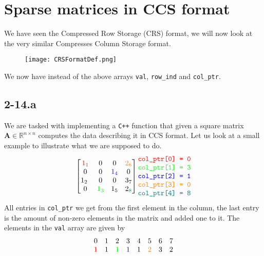 \documentclass{article}
\begin{document}
\section*{Sparse matrices in CCS format}
We have seen the Compressed Row Storage (CRS) format, we will now look at the very similar Compresses Column Storage format.

\begin{figure}[!hbt]
    \centering
\texttt{[image: CRSFormatDef.png]}
\end{figure}

\noindent We now have instead of the above arrays \verb|val|, \verb|row_ind| and \verb|col_ptr|. 
\subsection*{2-14.a} 
We are tasked with implementing a \verb|C++| function that given a square matrix $\mathbf{A} \in \mathbb{R}^{n \times n}$ computes the data describing it in CCS format. Let us look at a small example to illustrate what we are supposed to do.
\begin{equation*}
\begin{bmatrix}
    \color{red}1_{1}\color{black} & 0 & 0 & \color{orange}2_{6}\color{black} \\
    0 & 0 & \color{blue}1_{4}\color{black} & 0 \\
    1_{2}\ & 0 & 0 & 3_{7} \\
    0 & \color{green}1_{3}\color{black} & 1_{5} & 2_{\color{teal}8\color{black}}
    \end{bmatrix}
    \begin{matrix}
    \color{red}\verb|col_ptr[0] = 0|\color{black}  \\
    \color{green}\verb|col_ptr[1] = 3|\color{black} \\
\color{blue}\verb|col_ptr[2] = 1|\color{black} \\
\color{orange}\verb|col_ptr[3] = 0|\color{black} \\
\color{teal}\verb|col_ptr[4] = 8|\color{black}
    \end{matrix}  
\end{equation*}
All entries in \verb|col_ptr| we get from the first element in the column, the last entry is the amount of non-zero elements in the matrix and added one to it. The elements in the \verb|val| array are given by
\begin{equation*}
    \begin{matrix}
        0 & 1 & 2 & 3 & 4 & 5 & 6 & 7 \\
        \color{red}1\color{black} & 1 & \color{green}1\color{black} & \color{blue}1\color{black} & 1 & \color{orange}2\color{black} & 3 & 2
    \end{matrix}
\end{equation*}
\end{document}

